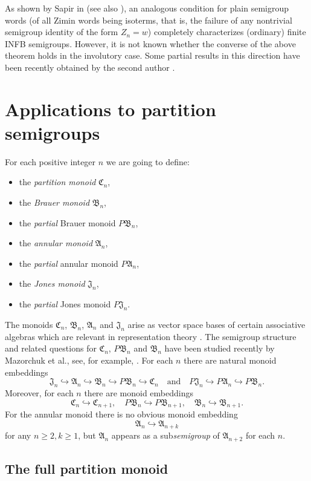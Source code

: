 \documentclass[preprint,1p,times]{elsarticle}
\numberwithin{equation}{section}
\theoremstyle{remark}
\def\A{\mathfrak{A}}
\def\C{\mathfrak{C}}
\def\B{\mathfrak{B}}
\def\J{\mathfrak{J}}
\begin{document}
As shown by Sapir in \cite{sapirburnside} (see also \cite{sapirinherently}), an analogous condition for plain semigroup
words (of all Zimin words being isoterms, that is, the failure of any nontrivial semigroup identity of the form
$Z_n=w$) completely characterizes (ordinary) finite INFB semigroups. However, it is not known whether the converse of
the above theorem holds in the involutory case. Some partial results in this direction have been recently obtained by
the second author \cite{Dolinka}.

\section{Applications to partition semigroups}

For each positive integer $n$ we are going to define:
\begin{itemize}
\item the \emph{partition monoid} $\C_n$,
\item the \emph{Brauer monoid} $\B_n$,
\item the \emph{partial} Brauer monoid $P\B_n$,
\item the \emph{annular monoid} $\A_n$,
\item the \emph{partial} annular monoid $P\A_n$,
\item the \emph{Jones monoid} $\J_n$,
\item the \emph{partial} Jones monoid $P\J_n$.
\end{itemize}
The monoids $\C_n$, $\B_n$, $\A_n$ and $\J_n$ arise as vector space bases of certain associative algebras which are
relevant in representation theory \cite{brauer, xi, jones, grahamlehrer}. The semigroup structure and related questions
for $\C_n$, $P\B_n$ and $\B_n$ have been studied recently by Mazorchuk et al., see, for example, \cite{Maz1, Maz2, KMM,
KM2,malcevmazorchuk}. For each $n$ there are natural monoid embeddings
$$\J_n \hookrightarrow \A_n \hookrightarrow  \B_n \hookrightarrow P\B_n \hookrightarrow \C_n\quad\mbox{and}\quad P\J_n\hookrightarrow
P\A_n\hookrightarrow P\B_n.$$ Moreover, for each $n$ there are monoid embeddings
$$\C_n \hookrightarrow \C_{n+1},\quad P\B_n\hookrightarrow P\B_{n+1},\quad \B_n\hookrightarrow\B_{n+1}.$$ For the annular
monoid there is no obvious monoid embedding
$$\A_n\hookrightarrow\A_{n+k}$$
for any $n\ge 2,k\ge 1$, but $\A_n$ appears as a sub\emph{semigroup} of $\A_{n+2}$ for each $n$.

\subsection{The full partition monoid}
\end{document}
